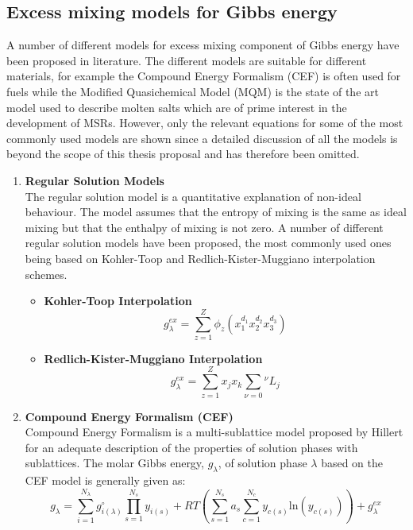 	\subsection{Excess mixing models for Gibbs energy}
	A number of different models for excess mixing component of Gibbs energy have been proposed in literature. The different models are suitable for different materials, for example the Compound Energy Formalism (CEF) is often used for  fuels while the Modified Quasichemical Model (MQM) is the state of the art model used to describe molten salts which are of prime interest in the development of MSRs. However, only the relevant equations for some of the most commonly used models are shown since a detailed discussion of all the models is beyond the scope of this thesis proposal and has therefore been omitted. 
	\begin{enumerate}
	\item \textbf{Regular Solution Models}\\ 
	The regular solution model is a quantitative explanation of non-ideal behaviour. The model assumes that the entropy of mixing is the same as ideal mixing but that the enthalpy of mixing is not zero. A number of different regular solution models have been proposed, the most commonly used ones being based on Kohler-Toop and Redlich-Kister-Muggiano interpolation schemes.
		\begin{itemize}
			\item \textbf{Kohler-Toop Interpolation}
			\begin{equation}
				g_{\lambda}^{ex} = \sum_{z=1}^Z \phi_z (x_1^{d_1} x_2^{d_2} x_3^{d_3} )
			\end{equation}
			\item \textbf{Redlich-Kister-Muggiano Interpolation}
			\begin{equation}
				g_{\lambda}^{ex} = \sum_{z=1}^Z x_j x_k \sum_{\nu = 0} {^\nu}L_{j}
			\end{equation}
			\end{itemize}
	\item \textbf{Compound Energy Formalism (CEF)} \\
	Compound Energy Formalism is a multi-sublattice model proposed by Hillert \cite{Hillert01} for an adequate description of the properties of solution phases with sublattices. The molar Gibbs energy, $g_{\lambda}$, of solution phase $\lambda$ based on the CEF model is generally given as:
	\begin{equation}\label{eq:g_lambda}
	g_{\lambda} = \sum_{i=1}^{N_{\lambda}} g_{i(\lambda)}^{\circ} \prod _{s=1}^{N_s} y_{i(s)} + RT\left( \sum_{s=1}^{N_s} a_s \sum_{c=1}^{N_c}   y_{c(s)} \mathrm{ln} (y_{c(s)}) \right) + g_{\lambda}^{ex}

\end{equation}
\end{enumerate}
